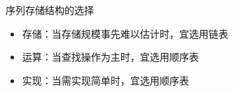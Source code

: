 \begin{frame}
    \frametitle{\insertsectionhead}
    \begin{alertblock}{序列存储结构的选择}
        \begin{itemize}
            \item 存储：当存储规模事先难以估计时，宜选用链表
            \item 运算：当查找操作为主时，宜选用顺序表
            \item 实现：当需实现简单时，宜选用顺序表
        \end{itemize}
    \end{alertblock}
\end{frame}